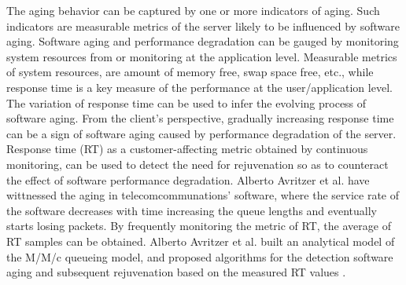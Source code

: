 \documentclass[10pt,journal,letterpaper,compsoc]{IEEEtran}
\begin{document}
The aging behavior can be captured by one or more indicators of aging.
Such indicators are measurable metrics of the server likely to be influenced
by software aging.
Software aging and performance degradation can be gauged by monitoring system
resources from or monitoring at the application level.
Measurable metrics of system resources, are amount of memory free,
swap space free, etc., while response time is a key measure of the performance
at the user/application level.
The variation of response time can be used to infer the evolving process of
software aging.
From the client’s perspective, gradually increasing response time can be
a sign of software aging caused by performance degradation of the server.
Response time (RT) as a customer-affecting metric obtained by continuous monitoring,
can be used to detect the need for rejuvenation so as to counteract the effect
of software performance degradation. 
Alberto Avritzer et al. have wittnessed the aging in telecomcommunations'
software, where the service rate of the software decreases with time
increasing the queue lengths and eventually starts losing packets.
By frequently monitoring the metric of RT,
the average of RT samples can be obtained.
Alberto Avritzer et al. built an analytical model of
the M/M/c queueing model, and
proposed algorithms for the detection software aging
and subsequent rejuvenation
based on the measured RT values \cite{ChScience:AAvritzer2006DSN}.
\end{document}
